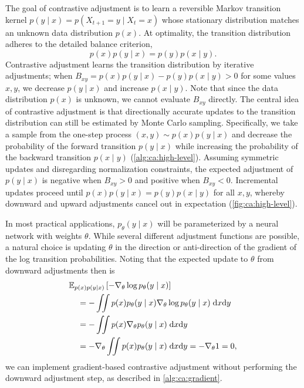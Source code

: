\documentclass[10pt,twocolumn,letterpaper]{article}
\begin{document}
The goal of contrastive adjustment is to learn a reversible Markov transition kernel $p(y \mid x) = p(X_{t+1} = y \mid X_{t} = x)$ whose stationary distribution matches an unknown data distribution $p(x)$.
At optimality, the transition distribution adheres to the detailed balance criterion,
\begin{equation}
  p(x) p(y \mid x) = p(y) p(x \mid y).
\end{equation}
Contrastive adjustment learns the transition distribution by iterative adjustments;
when $B_{xy} = p(x)p(y \mid x) - p(y)p(x \mid y) > 0$ for some values $x,y$, we decrease $p(y \mid x)$ and increase $p(x \mid y)$.
Note that since the data distribution $p(x)$ is unknown, we cannot evaluate $B_{xy}$ directly.
The central idea of contrastive adjustment is that directionally accurate updates to the transition distribution can still be estimated by Monte Carlo sampling.
Specifically, we take a sample from the one-step process $(x,y) \sim p(x)p(y \mid x)$ and decrease the probability of the forward transition $p(y \mid x)$ while increasing the probability of the backward transition $p(x \mid y)$ (\cref{alg:ca:high-level}).
Assuming symmetric updates and disregarding normalization constraints, the expected adjustment of $p(y \mid x)$ is negative when $B_{xy} > 0$ and positive when $B_{xy} < 0$.
Incremental updates proceed until $p(x)p(y \mid x) = p(y)p(x \mid y)$ for all $x,y$, whereby downward and upward adjustments cancel out in expectation (\cref{fig:ca:high-level}).

In most practical applications, $p_{\theta}(y \mid x)$ will be parameterized by a neural network with weights $\theta$.
While several different adjustment functions are possible, a natural choice is updating $\theta$ in the direction or anti-direction of the gradient of the log transition probabilities.
Noting that the expected update to $\theta$ from downward adjustments then is
\begin{align}
  \mathbb{E}_{p(x)p(y \mid x)}\left[-\nabla_{\theta} \log p_{\theta}(y \mid x) \right]
  & \nonumber \\
  & \hspace{-4.0cm}
    = -\iint p(x)p_{\theta}(y \mid x) \nabla_{\theta} \log p_{\theta}(y \mid x)  \; \mathrm{d}x \mathrm{d}y
  \\
  & \hspace{-4.0cm}
    = -\iint p(x) \nabla_{\theta} p_{\theta}(y \mid x)  \; \mathrm{d}x \mathrm{d}y
  \\
  & \hspace{-4.0cm}
    = -\nabla_{\theta} \iint p(x) p_{\theta}(y \mid x) \; \mathrm{d}x \mathrm{d}y
    = -\nabla_{\theta} 1 = 0,
\end{align}
we can implement gradient-based contrastive adjustment without performing the downward adjustment step, as described in \cref{alg:ca:gradient}.
\end{document}
